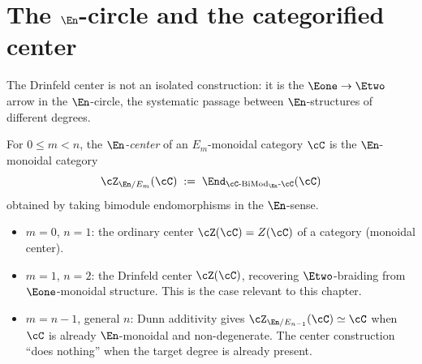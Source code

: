 \section{The \texorpdfstring{$\En$}{E-n}-circle and the categorified center}
\label{sec:en-circle}

The Drinfeld center is not an isolated construction: it is
the $\Eone \to \Etwo$ arrow in the $\En$-circle, the
systematic passage between $\En$-structures of different degrees.

\begin{definition}
\label{def:en-center}
For $0 \leq m < n$, the \emph{$\En$-center} of an
$E_m$-monoidal category $\cC$ is the $\En$-monoidal category
\[
 \cZ_{\En/E_m}(\cC) \;:=\;
 \End_{\cC\text{-}\mathrm{BiMod}_{\En}\text{-}\cC}(\cC)
\]
obtained by taking bimodule endomorphisms in the $\En$-sense.
\begin{itemize}
 \item $m = 0$, $n = 1$: the ordinary center
 $\cZ(\cC) = Z(\cC)$ of a category (monoidal center).
 \item $m = 1$, $n = 2$: the Drinfeld center
 $\cZ(\cC)$, recovering $\Etwo$-braiding from $\Eone$-monoidal
 structure. This is the case relevant to this chapter.
 \item $m = n - 1$, general $n$: Dunn additivity gives
 $\cZ_{\En/E_{n-1}}(\cC) \simeq \cC$ when $\cC$ is already
 $\En$-monoidal and non-degenerate. The center construction
 ``does nothing'' when the target degree is already present.
\end{itemize}
\end{definition}

